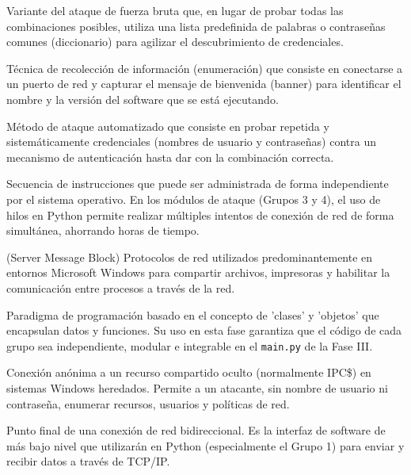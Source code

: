 \documentclass[12pt,letterpaper]{article}
\begin{document}
\begin{description}[leftmargin=!,labelwidth=\widthof{\bfseries Programación Orientada a Objetos (POO)}]
    
    \item[\textbf{Ataque de Diccionario}] Variante del ataque de fuerza bruta que, en lugar de probar todas las combinaciones posibles, utiliza una lista predefinida de palabras o contraseñas comunes (diccionario) para agilizar el descubrimiento de credenciales.
    
    \item[\textbf{Banner Grabbing}] Técnica de recolección de información (enumeración) que consiste en conectarse a un puerto de red y capturar el mensaje de bienvenida (banner) para identificar el nombre y la versión del software que se está ejecutando.
    
    \item[\textbf{Fuerza Bruta (Brute Force)}] Método de ataque automatizado que consiste en probar repetida y sistemáticamente credenciales (nombres de usuario y contraseñas) contra un mecanismo de autenticación hasta dar con la combinación correcta.
    
    \item[\textbf{Hilo (Thread) / Concurrencia}] Secuencia de instrucciones que puede ser administrada de forma independiente por el sistema operativo. En los módulos de ataque (Grupos 3 y 4), el uso de hilos en Python permite realizar múltiples intentos de conexión de red de forma simultánea, ahorrando horas de tiempo.
    
    \item[\textbf{NetBIOS / SMB}] (Server Message Block) Protocolos de red utilizados predominantemente en entornos Microsoft Windows para compartir archivos, impresoras y habilitar la comunicación entre procesos a través de la red.
    
    \item[\textbf{Programación Orientada a Objetos (POO)}] Paradigma de programación basado en el concepto de 'clases' y 'objetos' que encapsulan datos y funciones. Su uso en esta fase garantiza que el código de cada grupo sea independiente, modular e integrable en el \texttt{main.py} de la Fase III.
    
    \item[\textbf{Sesión Nula (Null Session)}] Conexión anónima a un recurso compartido oculto (normalmente IPC\$) en sistemas Windows heredados. Permite a un atacante, sin nombre de usuario ni contraseña, enumerar recursos, usuarios y políticas de red.
    
    \item[\textbf{Socket}] Punto final de una conexión de red bidireccional. Es la interfaz de software de más bajo nivel que utilizarán en Python (especialmente el Grupo 1) para enviar y recibir datos a través de TCP/IP.
    
\end{description}
\end{document}
